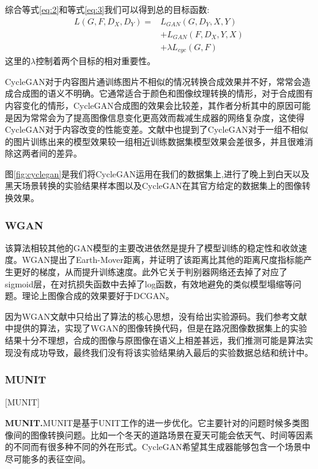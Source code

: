 综合等式\ref{eq:2}和等式\ref{eq:3}我们可以得到总的目标函数:
\begin{equation}
\begin{aligned}
    L(G, F, D_X, D_Y) = & L_{GAN}(G,D_Y, X, Y) \\
    & + L_{GAN}(F,D_X, Y, X) \\
    & + \lambda L_{cyc}(G, F)
\end{aligned}
\end{equation}
这里的$\lambda$控制着两个目标的相对重要性。

CycleGAN对于内容图片通训练图片不相似的情况转换合成效果并不好，常常会造成合成图的语义不明确。它通常适合于颜色和图像纹理转换的情形，对于合成图有内容变化的情形，CycleGAN合成图的效果会比较差，其作者分析其中的原因可能是因为常常会为了提高图像信息变化更高效而裁减生成器的网络复杂度，这使得CycleGAN对于内容改变的性能变差。文献\cite{CycleGAN}中也提到了CycleGAN对于一组不相似的图片训练出来的模型效果较一组相近训练数据集模型效果会差很多，并且很难消除这两者间的差异。

图\ref{fig:cyclegan}是我们将CycleGAN运用在我们的数据集上,进行了晚上到白天以及黑天场景转换的实验结果样本图以及CycleGAN在其官方给定的数据集上的图像转换效果。 


\subsubsection{WGAN}

 该算法相较其他的GAN模型的主要改进依然是提升了模型训练的稳定性和收敛速度。WGAN提出了Earth-Mover距离，并证明了该距离比其他的距离尺度指标能产生更好的梯度，从而提升训练速度。此外它关于判别器网络还去掉了对应了sigmoid层，在对抗损失函数中去掉了log函数，有效地避免的类似模型塌缩等问题。理论上图像合成的效果要好于DCGAN。

因为WGAN文献中只给出了算法的核心思想，没有给出实验源码。我们参考文献中提供的算法，实现了WGAN的图像转换代码，但是在路况图像数据集上的实验结果十分不理想，合成的图像与原图像在语义上相差甚远，我们推测可能是算法实现没有成功导致，最终我们没有将该实验结果纳入最后的实验数据总结和统计中。

\subsubsection{MUNIT}[MUNIT]

\textbf{MUNIT.}\cite{MUNIT}\quad MUNIT是基于UNIT\cite{UNIT}工作的进一步优化。它主要针对的问题时候多类图像间的图像转换问题。比如一个冬天的道路场景在夏天可能会依天气、时间等因素的不同而有很多种不同的外在形式。CycleGAN希望其生成器能够包含一个场景中尽可能多的表征空间。


